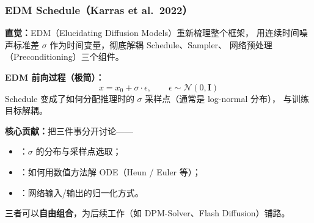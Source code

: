 \subsubsection{EDM Schedule（Karras et al.\ 2022）}

\begin{intubox}
\textbf{直觉：}EDM（Elucidating Diffusion Models）重新梳理整个框架，
用连续时间噪声标准差 $\sigma$ 作为时间变量，彻底解耦 Schedule、Sampler、
网络预处理（Preconditioning）三个组件。
\end{intubox}

\begin{conceptbox}
\textbf{EDM 前向过程（极简）：}
$$x = x_0 + \sigma \cdot \epsilon, \qquad \epsilon \sim \mathcal{N}(0,\mathbf{I})$$
Schedule 变成了如何分配推理时的 $\sigma$ 采样点（通常是 log-normal 分布），
与训练目标解耦。
\end{conceptbox}

\textbf{核心贡献：}把三件事分开讨论——
\begin{itemize}
  \item {}：$\sigma$ 的分布与采样点选取；
  \item {}：如何用数值方法解 ODE（Heun / Euler 等）；
  \item {}：网络输入/输出的归一化方式。
\end{itemize}
三者可以\textbf{自由组合}，为后续工作（如 DPM-Solver、Flash Diffusion）铺路。

